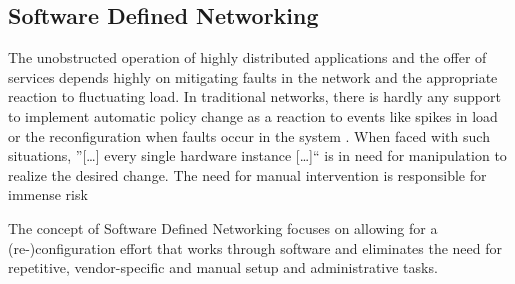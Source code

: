 \subsection{Software Defined Networking}
\label{sec:sdn}

The unobstructed operation of highly distributed applications and the offer of services depends highly on mitigating faults in the network and the appropriate reaction to fluctuating load. In traditional networks, there is hardly any support to implement automatic policy change as a reaction to events like spikes in load or the reconfiguration when faults occur in the system \cite{kreutz2015software}. When faced with such situations, ''[\dots] every single hardware instance [\dots]`` \cite{grossmann2013auto} is in need for manipulation to realize the desired change.  The need for manual intervention is responsible for immense risk 

The concept of Software Defined Networking focuses on allowing for a (re-)configuration effort that works through software and eliminates the need for repetitive, vendor-specific and manual setup and administrative tasks.  

